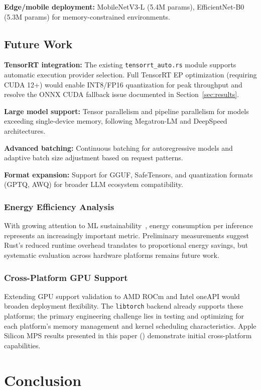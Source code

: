 \documentclass[10pt,twocolumn,a4paper]{article}
\theoremstyle{definition}
\theoremstyle{plain}
\begin{document}
\textbf{Edge/mobile deployment:} MobileNetV3-L (5.4M params), EfficientNet-B0 (5.3M params) for memory-constrained environments.

\subsection{Future Work}

\textbf{TensorRT integration:} The existing \texttt{tensorrt\_auto.rs} module supports automatic execution provider selection. Full TensorRT EP optimization (requiring CUDA 12+) would enable INT8/FP16 quantization for peak throughput and resolve the ONNX CUDA fallback issue documented in Section~\ref{sec:results}.

\textbf{Large model support:} Tensor parallelism and pipeline parallelism for models exceeding single-device memory, following Megatron-LM and DeepSpeed architectures.

\textbf{Advanced batching:} Continuous batching for autoregressive models and adaptive batch size adjustment based on request patterns.

\textbf{Format expansion:} Support for GGUF, SafeTensors, and quantization formats (GPTQ, AWQ) for broader LLM ecosystem compatibility.

\subsubsection{Energy Efficiency Analysis}
With growing attention to ML sustainability~\citep{patterson2021carbon}, energy consumption per inference represents an increasingly important metric. Preliminary measurements suggest Rust's reduced runtime overhead translates to proportional energy savings, but systematic evaluation across hardware platforms remains future work.

\subsubsection{Cross-Platform GPU Support}
Extending GPU support validation to AMD ROCm and Intel oneAPI would broaden deployment flexibility. The \texttt{libtorch} backend already supports these platforms; the primary engineering challenge lies in testing and optimizing for each platform's memory management and kernel scheduling characteristics. Apple Silicon MPS results presented in this paper () demonstrate initial cross-platform capabilities.

\section{Conclusion}
\label{sec:conclusion}
\end{document}
